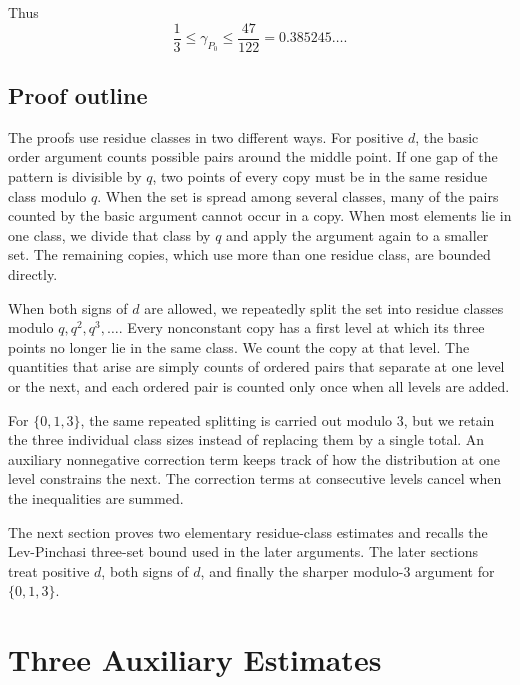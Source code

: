 \documentclass[11pt]{article}
\numberwithin{equation}{section}
\theoremstyle{remark}
\begin{document}
Thus
\begin{equation}\label{eq:013-window}
 \frac13\le\gamma_{P_0}\le\frac{47}{122}=0.385245\ldots.
\end{equation}

\subsection*{Proof outline}
The proofs use residue classes in two different ways.  For positive $d$, the
basic order argument counts possible pairs around the middle point.  If one
gap of the pattern is divisible by $q$, two points of every copy must be in
the same residue class modulo $q$.  When the set is spread among several
classes, many of the pairs counted by the basic argument cannot occur in a
copy.  When most elements lie in one class, we divide that class by $q$ and
apply the argument again to a smaller set.  The remaining copies, which use
more than one residue class, are bounded directly.

When both signs of $d$ are allowed, we repeatedly split the set into residue
classes modulo $q,q^2,q^3,\ldots$.  Every nonconstant copy has a first level
at which its three points no longer lie in the same class.  We count the copy
at that level.  The quantities that arise are simply counts of ordered pairs
that separate at one level or the next, and each ordered pair is counted only
once when all levels are added.

For $\{0,1,3\}$, the same repeated splitting is carried out modulo $3$, but
we retain the three individual class sizes instead of replacing them by a
single total.  An auxiliary nonnegative correction term keeps track of how the distribution
at one level constrains the next.  The correction terms at consecutive
levels cancel when the inequalities are summed.

The next section proves two elementary residue-class estimates and recalls
the Lev-Pinchasi three-set bound used in the later arguments. 
The later sections treat positive $d$, both signs of $d$, and
finally the sharper modulo-$3$ argument for $\{0,1,3\}$.
\section{Three Auxiliary Estimates}\label{sec:common}
\end{document}
